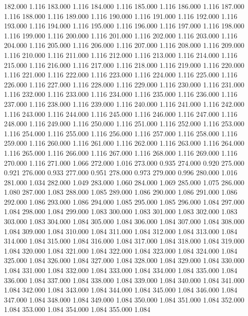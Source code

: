 182.000 1.116 
183.000 1.116 
184.000 1.116 
185.000 1.116 
186.000 1.116 
187.000 1.116 
188.000 1.116 
189.000 1.116 
190.000 1.116 
191.000 1.116 
192.000 1.116 
193.000 1.116 
194.000 1.116 
195.000 1.116 
196.000 1.116 
197.000 1.116 
198.000 1.116 
199.000 1.116 
200.000 1.116 
201.000 1.116 
202.000 1.116 
203.000 1.116 
204.000 1.116 
205.000 1.116 
206.000 1.116 
207.000 1.116 
208.000 1.116 
209.000 1.116 
210.000 1.116 
211.000 1.116 
212.000 1.116 
213.000 1.116 
214.000 1.116 
215.000 1.116 
216.000 1.116 
217.000 1.116 
218.000 1.116 
219.000 1.116 
220.000 1.116 
221.000 1.116 
222.000 1.116 
223.000 1.116 
224.000 1.116 
225.000 1.116 
226.000 1.116 
227.000 1.116 
228.000 1.116 
229.000 1.116 
230.000 1.116 
231.000 1.116 
232.000 1.116 
233.000 1.116 
234.000 1.116 
235.000 1.116 
236.000 1.116 
237.000 1.116 
238.000 1.116 
239.000 1.116 
240.000 1.116 
241.000 1.116 
242.000 1.116 
243.000 1.116 
244.000 1.116 
245.000 1.116 
246.000 1.116 
247.000 1.116 
248.000 1.116 
249.000 1.116 
250.000 1.116 
251.000 1.116 
252.000 1.116 
253.000 1.116 
254.000 1.116 
255.000 1.116 
256.000 1.116 
257.000 1.116 
258.000 1.116 
259.000 1.116 
260.000 1.116 
261.000 1.116 
262.000 1.116 
263.000 1.116 
264.000 1.116 
265.000 1.116 
266.000 1.116 
267.000 1.116 
268.000 1.116 
269.000 1.116 
270.000 1.116 
271.000 1.066 
272.000 1.016 
273.000 0.935 
274.000 0.920 
275.000 0.921 
276.000 0.933 
277.000 0.951 
278.000 0.973 
279.000 0.996 
280.000 1.016 
281.000 1.034 
282.000 1.049 
283.000 1.060 
284.000 1.069 
285.000 1.075 
286.000 1.080 
287.000 1.083 
288.000 1.085 
289.000 1.086 
290.000 1.086 
291.000 1.086 
292.000 1.086 
293.000 1.086 
294.000 1.085 
295.000 1.085 
296.000 1.084 
297.000 1.084 
298.000 1.084 
299.000 1.083 
300.000 1.083 
301.000 1.083 
302.000 1.083 
303.000 1.083 
304.000 1.084 
305.000 1.084 
306.000 1.084 
307.000 1.084 
308.000 1.084 
309.000 1.084 
310.000 1.084 
311.000 1.084 
312.000 1.084 
313.000 1.084 
314.000 1.084 
315.000 1.084 
316.000 1.084 
317.000 1.084 
318.000 1.084 
319.000 1.084 
320.000 1.084 
321.000 1.084 
322.000 1.084 
323.000 1.084 
324.000 1.084 
325.000 1.084 
326.000 1.084 
327.000 1.084 
328.000 1.084 
329.000 1.084 
330.000 1.084 
331.000 1.084 
332.000 1.084 
333.000 1.084 
334.000 1.084 
335.000 1.084 
336.000 1.084 
337.000 1.084 
338.000 1.084 
339.000 1.084 
340.000 1.084 
341.000 1.084 
342.000 1.084 
343.000 1.084 
344.000 1.084 
345.000 1.084 
346.000 1.084 
347.000 1.084 
348.000 1.084 
349.000 1.084 
350.000 1.084 
351.000 1.084 
352.000 1.084 
353.000 1.084 
354.000 1.084 
355.000 1.084 
